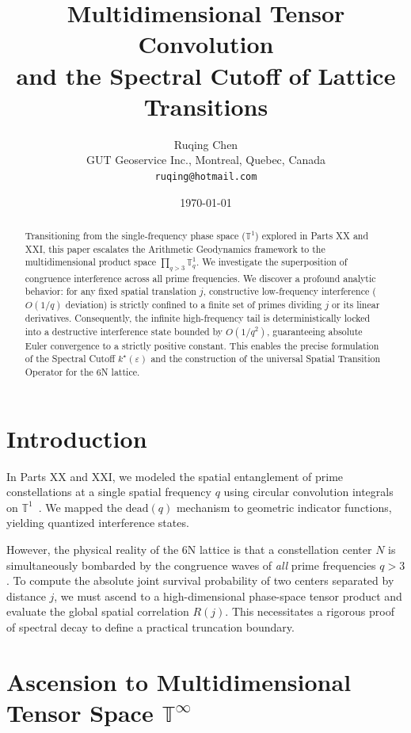 \documentclass[11pt,a4paper]{article}
\title{\Large \textbf{Multidimensional Tensor Convolution\\ and the Spectral Cutoff of Lattice Transitions}}
\author{Ruqing Chen\\
\small GUT Geoservice Inc., Montreal, Quebec, Canada\\
\small \texttt{ruqing@hotmail.com}}
\date{\today}
\begin{document}
\maketitle

\begin{abstract}
Transitioning from the single-frequency phase space ($\mathbb{T}^1$) explored in Parts XX and XXI, this paper escalates the Arithmetic Geodynamics framework to the multidimensional product space $\prod_{q>3}\mathbb{T}^1_q$. We investigate the superposition of congruence interference across all prime frequencies. We discover a profound analytic behavior: for any fixed spatial translation $j$, constructive low-frequency interference ($O(1/q)$ deviation) is strictly confined to a finite set of primes dividing $j$ or its linear derivatives. Consequently, the infinite high-frequency tail is deterministically locked into a destructive interference state bounded by $O(1/q^2)$, guaranteeing absolute Euler convergence to a strictly positive constant. This enables the precise formulation of the Spectral Cutoff $k^\star(\varepsilon)$ and the construction of the universal Spatial Transition Operator for the 6N lattice.
\end{abstract}

\section{Introduction}
In Parts XX and XXI, we modeled the spatial entanglement of prime constellations at a single spatial frequency $q$ using circular convolution integrals on $\mathbb{T}^1$~\cite{ChenXX,ChenXXI}. We mapped the $\mathrm{dead}(q)$ mechanism to geometric indicator functions, yielding quantized interference states.

However, the physical reality of the 6N lattice is that a constellation center $N$ is simultaneously bombarded by the congruence waves of \textit{all} prime frequencies $q > 3$. To compute the absolute joint survival probability of two centers separated by distance $j$, we must ascend to a high-dimensional phase-space tensor product and evaluate the global spatial correlation $R(j)$. This necessitates a rigorous proof of spectral decay to define a practical truncation boundary.

\section{Ascension to Multidimensional Tensor Space $\mathbb{T}^\infty$}
\end{document}
